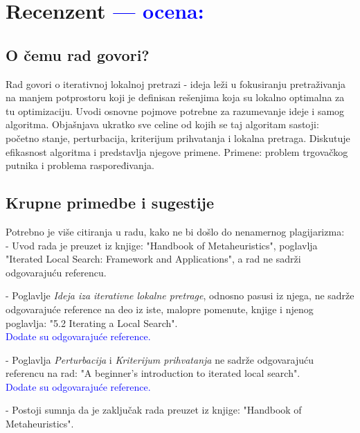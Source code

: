 \documentclass[a4paper]{report}
\newcommand{\odgovor}[1]{\textcolor{blue}{#1}}
\begin{document}
\chapter{Recenzent \odgovor{--- ocena:} }


\section{O čemu rad govori?}
Rad govori o iterativnoj lokalnoj pretrazi -  ideja leži u fokusiranju pretraživanja na manjem potprostoru koji je definisan rešenjima koja su lokalno optimalna za tu optimizaciju. Uvodi osnovne pojmove potrebne za razumevanje ideje i samog algoritma. Objašnjava ukratko sve celine od kojih se taj algoritam sastoji: početno stanje, perturbacija, kriterijum prihvatanja i lokalna pretraga. Diskutuje efikasnost algoritma i predstavlja njegove primene. Primene: problem trgovačkog putnika i problema raspoređivanja.

\section{Krupne primedbe i sugestije}
Potrebno je više citiranja u radu, kako ne bi došlo do nenamernog plagijarizma: \\

- Uvod rada je preuzet iz knjige: "Handbook of Metaheuristics", poglavlja "Iterated Local Search: Framework and Applications", a rad ne sadrži odgovarajuću referencu.

- Poglavlje {\em Ideja iza iterativne lokalne pretrage}, odnosno pasusi iz njega, ne sadrže odgovarajuće reference na deo iz iste, malopre pomenute, knjige i njenog poglavlja: "5.2 Iterating a Local Search".\\
\odgovor{Dodate su odgovarajuće reference.\\}

- Poglavlja {\em Perturbacija} i {\em Kriterijum prihvatanja} ne sadrže odgovarajuću referencu na rad: "A beginner's introduction to iterated local search".\\
\odgovor{Dodate su odgovarajuće reference.\\}

- Postoji sumnja da je zaključak rada preuzet iz knjige: "Handbook of Metaheuristics".
\end{document}

